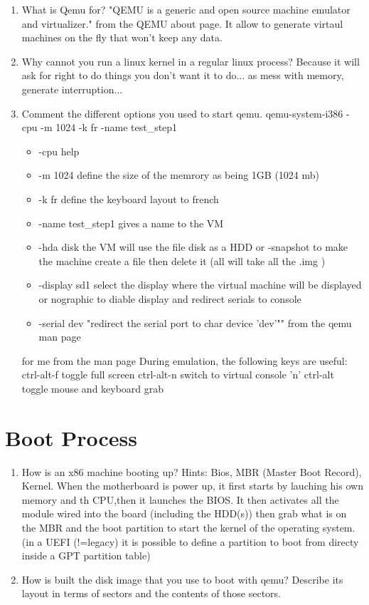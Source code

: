 \documentclass[10]{article}
\begin{document}
\begin{enumerate}
\item 
What is Qemu for?
"QEMU is a generic and open source machine emulator and virtualizer." from the QEMU about page.
It allow to generate virtaul machines on the fly that won't keep any data.
\item
Why cannot you run a linux kernel in a regular linux process?
Because it will ask for right to do things you don't want it to do... as mess with memory, generate interruption...
\item
Comment the different options you used to start qemu.
qemu-system-i386 -cpu -m 1024 -k fr -name test_step1
\begin{itemize}
\item -cpu help
\item -m 1024 			define the size of the memrory as being 1GB (1024 mb)
\item -k fr 			define the keyboard layout to french
\item -name test_step1	gives a name to the VM
\item -hda disk			the VM will use the file disk as a HDD
or -snapshot to make the machine create a file then delete it (all will take all the .img )
\item -display sd1		select the display where the virtual machine will be displayed or nographic to diable display and redirect serials to console
\item -serial dev 		"redirect the serial port to char device 'dev'"" from the qemu man page
\end{itemize}

for me from the man page
During emulation, the following keys are useful:
ctrl-alt-f      toggle full screen
ctrl-alt-n      switch to virtual console 'n'
ctrl-alt        toggle mouse and keyboard grab

\end{enumerate}

\section{Boot Process}

\begin{enumerate}
\item
How is an x86 machine booting up?
Hints: Bios, MBR (Master Boot Record), Kernel.
When the motherboard is power up, it first starts by lauching his own memory and th CPU,then it launches the BIOS. It then activates all the module wired into the board (including the HDD(s)) then grab what is on the MBR and the boot partition to start the kernel of the operating system.
(in a UEFI (!=legacy) it is possible to define a partition to boot from directy inside a GPT partition table)
\item
How is built the disk image that you use to boot with qemu?
Describe its layout in terms of sectors and the contents of 
those sectors.

\end{enumerate}
\end{document}
